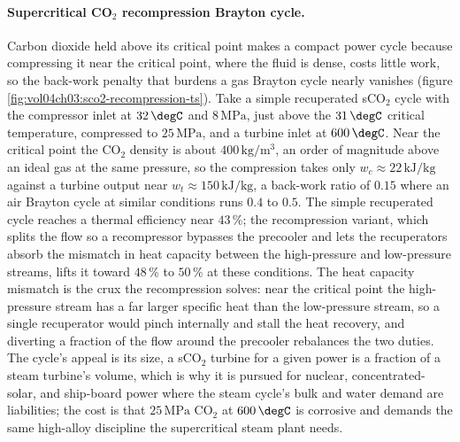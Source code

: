 \paragraph{Supercritical CO\texorpdfstring{$_2$}{2} recompression Brayton cycle.}
Carbon dioxide held above its critical point makes a compact power cycle because
compressing it near the critical point, where the fluid is dense, costs little
work, so the back-work penalty that burdens a gas Brayton cycle nearly vanishes
(figure \ref{fig:vol04ch03:sco2-recompression-ts}). Take a simple recuperated
sCO$_2$ cycle with the compressor inlet at $32\,\degC$ and $8\,\text{MPa}$, just
above the $31\,\degC$ critical temperature, compressed to $25\,\text{MPa}$, and a
turbine inlet at $600\,\degC$. Near the critical point the CO$_2$ density is about
$400\,\text{kg}/\text{m}^3$, an order of magnitude above an ideal gas at the same
pressure, so the compression takes only $w_c \approx 22\,\text{kJ}/\text{kg}$
against a turbine output near $w_t \approx 150\,\text{kJ}/\text{kg}$, a back-work
ratio of $0.15$ where an air Brayton cycle at similar conditions runs $0.4$ to
$0.5$. The simple recuperated cycle reaches a thermal efficiency near $43\,\%$;
the recompression variant, which splits the flow so a recompressor bypasses the
precooler and lets the recuperators absorb the mismatch in heat capacity between
the high-pressure and low-pressure streams, lifts it toward $48\,\%$ to $50\,\%$
at these conditions. The heat capacity mismatch is the crux the recompression
solves: near the critical point the high-pressure stream has a far larger
specific heat than the low-pressure stream, so a single recuperator would pinch
internally and stall the heat recovery, and diverting a fraction of the flow
around the precooler rebalances the two duties. The cycle's appeal is its
size, a sCO$_2$ turbine for a given power is a fraction of a steam turbine's
volume, which is why it is pursued for nuclear, concentrated-solar, and
ship-board power where the steam cycle's bulk and water demand are liabilities;
the cost is that $25\,\text{MPa}$ CO$_2$ at $600\,\degC$ is corrosive and demands
the same high-alloy discipline the supercritical steam plant needs.



